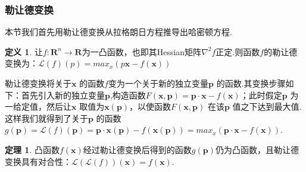 \documentclass[UTF8,10.5pt,a4paper]{ctexart}
\numberwithin{equation}{section}
\theoremstyle{definition}
\newtheorem{thm}{定理\hspace{0.05pt}}[section]
\theoremstyle{definition}
\newtheorem{dfn}{定义\hspace{0.05pt}}[section]
\begin{document}
\subsubsection{勒让德变换}
本节我们首先用勒让德变换从拉格朗日方程推导出哈密顿方程.
\begin{dfn}
让$f:\mathbf{R}^n\rightarrow\mathbf{R}$为一凸函数，也即其Hessian矩阵$\nabla^2f$正定.则函数$f$的勒让德变换为：$\mathcal{L}(f)(p)=max_x(p\textbf{x}-f(\textbf{x}))$
\end{dfn}
勒让德变换将关于$\mathbf{x}$ 的函数$f$变为一个关于新的独立变量$\textbf{p}$ 的函数.其变换步骤如下：首先引入新的独立变量$\textbf{p}$,构造函数$F(\textbf{x},\textbf{p})=\textbf{p}\cdot \textbf{x}-f(\textbf{x})$；此时假定$\textbf{p}$ 为一给定值，然后让$\textbf{x}$ 取值为$\textbf{x}(\textbf{p})$，以使函数$F(\textbf{x},\textbf{p})$ 在该$\textbf{p}$ 值之下达到最大值.这样我们就得到了关于$\textbf{p}$ 的函数$g(\textbf{p})=\mathcal{L}(f)(\textbf{p})=\textbf{p}\cdot \textbf{x}(\textbf{p})-f(\textbf{x}(\textbf{p}))=max_x(\textbf{p}\cdot \textbf{x}-f(\textbf{x}))$.
\begin{thm}
凸函数$f(\textbf{x})$经过勒让德变换后得到的函数$g(\textbf{p})$仍为凸函数，且勒让德变换具有对合性：$\mathcal{L}(\mathcal{L}(f))(\textbf{x})=f(\textbf{x})$.
\end{thm}
\end{document}
